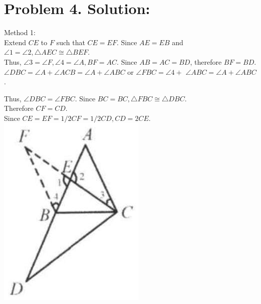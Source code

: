 \documentclass[10pt]{article}
\begin{document}
\section*{Problem 4. Solution:}
Method 1:\\
Extend \(C E\) to \(F\) such that \(C E=E F\). Since \(A E=E B\) and \(\angle 1=\angle 2, \triangle A E C \cong \triangle B E F\).\\
Thus, \(\angle 3=\angle F, \angle 4=\angle A, B F=A C\). Since \(A B=A C=B D\), therefore \(B F=B D\). \(\angle D B C=\angle A+\angle A C B=\angle A+\angle A B C\) or \(\angle F B C=\angle 4+\) \(\angle A B C=\angle A+\angle A B C\).

Thus, \(\angle D B C=\angle F B C\). Since \(B C=B C, \triangle F B C \cong \triangle D B C\).\\
Therefore \(C F=C D\).\\
Since \(C E=E F=1 / 2 C F=1 / 2 C D, C D=2 C E\).\\
\includegraphics[max width=\textwidth, center]{2025_04_17_97bc1f7e44d93c271a88g-030}
\end{document}

